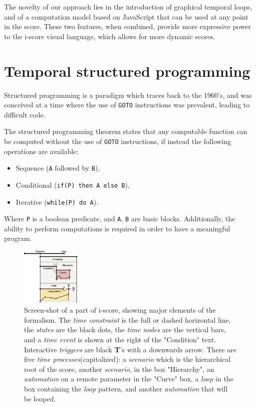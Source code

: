 \documentclass{article}
\newcommand{\scenario}{\textit{scenario}\xspace}
\newcommand{\Loop}{\textit{loop}\xspace}
\newcommand{\states}{\textit{states}\xspace}
\newcommand{\timeevent}{\textit{time event}\xspace}
\newcommand{\timenodes}{\textit{time nodes}\xspace}
\newcommand{\timeconstraint}{\textit{time constraint}\xspace}
\newcommand{\timeprocesses}{\textit{time processes}\xspace}
\newcommand{\automation}{\textit{automation}\xspace}
\newcommand{\triggers}{\textit{triggers}\xspace}
\begin{document}
The novelty of our approach lies in the introduction of graphical temporal loops, and of a computation model 
based on JavaScript that can be used at any point in the score. 
These two features, when combined, provide more expressive power to the i-score visual language, 
which allows for more dynamic scores.

\section{Temporal structured programming}
Structured programming is a paradigm which traces 
back to the 1960's, and was conceived at a time where the use of \lstinline{GOTO}
instructions was prevalent, leading to difficult code.

The structured programming theorem\cite{bohm1966flow,mills1972mathematical} states that any computable function can be computed 
without the use of \lstinline{GOTO} instructions, if instead the following operations are available: 
\begin{itemize}
    \item Sequence (\lstinline{A} followed by \lstinline{B}), 
    \item Conditional (\lstinline{if(P) then A else B}), 
    \item Iterative (\lstinline{while(P) do A}).
\end{itemize}

Where \lstinline|P| is a boolean predicate, and \lstinline|A|, \lstinline|B| are basic blocks.
Additionally, the ability to perform computations is required in order to have a meaningful program.

\begin{figure}
    \centering
    \includegraphics[width=0.25\textwidth]{images/hierarchy.eps}
    \caption{Screen-shot of a part of i-score, showing major elements of the formalism. The \timeconstraint is the full or dashed horizontal line, the \states are the black dots, the \timenodes are the vertical bars, and a \timeevent is shown at the right of the "Condition" text. Interactive \triggers are black \textbf{T}'s with a downwards arrow. There are five \timeprocesses (capitalized): a \scenario which is the hierarchical root of the score, another \scenario, in the box "Hierarchy", an \automation on a remote parameter in the "Curve" box, a \Loop in the box containing the \Loop pattern, and another \automation that will be looped.}
    \label{fig.hierarchy}
\end{figure}
\end{document}
